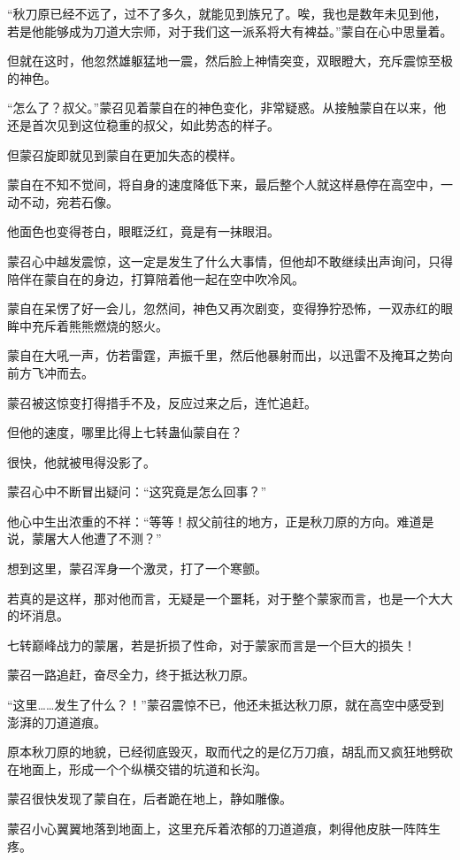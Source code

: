 \begin{this_body}
“秋刀原已经不远了，过不了多久，就能见到族兄了。唉，我也是数年未见到他，若是他能够成为刀道大宗师，对于我们这一派系将大有裨益。”蒙自在心中思量着。

但就在这时，他忽然雄躯猛地一震，然后脸上神情突变，双眼瞪大，充斥震惊至极的神色。

“怎么了？叔父。”蒙召见着蒙自在的神色变化，非常疑惑。从接触蒙自在以来，他还是首次见到这位稳重的叔父，如此势态的样子。

但蒙召旋即就见到蒙自在更加失态的模样。

蒙自在不知不觉间，将自身的速度降低下来，最后整个人就这样悬停在高空中，一动不动，宛若石像。

他面色也变得苍白，眼眶泛红，竟是有一抹眼泪。

蒙召心中越发震惊，这一定是发生了什么大事情，但他却不敢继续出声询问，只得陪伴在蒙自在的身边，打算陪着他一起在空中吹冷风。

蒙自在呆愣了好一会儿，忽然间，神色又再次剧变，变得狰狞恐怖，一双赤红的眼眸中充斥着熊熊燃烧的怒火。

蒙自在大吼一声，仿若雷霆，声振千里，然后他暴射而出，以迅雷不及掩耳之势向前方飞冲而去。

蒙召被这惊变打得措手不及，反应过来之后，连忙追赶。

但他的速度，哪里比得上七转蛊仙蒙自在？

很快，他就被甩得没影了。

蒙召心中不断冒出疑问：“这究竟是怎么回事？”

他心中生出浓重的不祥：“等等！叔父前往的地方，正是秋刀原的方向。难道是说，蒙屠大人他遭了不测？”

想到这里，蒙召浑身一个激灵，打了一个寒颤。

若真的是这样，那对他而言，无疑是一个噩耗，对于整个蒙家而言，也是一个大大的坏消息。

七转巅峰战力的蒙屠，若是折损了性命，对于蒙家而言是一个巨大的损失！

蒙召一路追赶，奋尽全力，终于抵达秋刀原。

“这里……发生了什么？！”蒙召震惊不已，他还未抵达秋刀原，就在高空中感受到澎湃的刀道道痕。

原本秋刀原的地貌，已经彻底毁灭，取而代之的是亿万刀痕，胡乱而又疯狂地劈砍在地面上，形成一个个纵横交错的坑道和长沟。

蒙召很快发现了蒙自在，后者跪在地上，静如雕像。

蒙召小心翼翼地落到地面上，这里充斥着浓郁的刀道道痕，刺得他皮肤一阵阵生疼。


\end{this_body}
